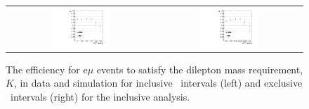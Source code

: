 \begin{figure}[!ht]
\begin{center}
\begin{tabular}{cc}
\includegraphics[width=0.4\textwidth]{plots/extractK_inclusive_19p5fb.pdf} &
\includegraphics[width=0.4\textwidth]{plots/extractK_exclusive_19p5fb.pdf} \\
\end{tabular}
\caption{\label{fig:K_incl}
The efficiency for e$\mu$ events to satisfy the dilepton mass requirement, $K$, in data and simulation for inclusive \MET\ intervals (left) and
exclusive \MET\ intervals (right) for the inclusive analysis. 
}

\end{center}
\end{figure}
